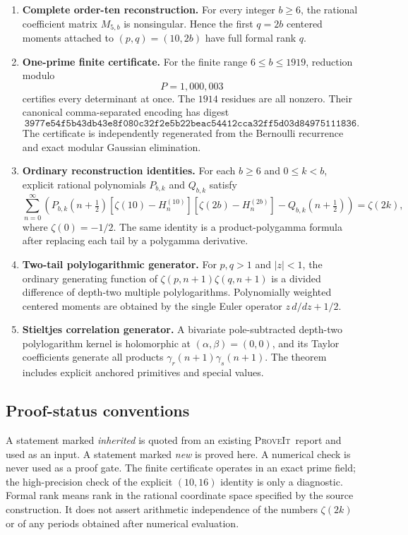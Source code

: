 \documentclass[11pt]{article}
\theoremstyle{definition}
\newcommand{\Repo}{\textsc{ProveIt}}
\begin{document}
\begin{enumerate}[label=\textbf{M\arabic*.}]
\item \textbf{Complete order-ten reconstruction.}
For every integer $b\ge6$, the rational coefficient matrix $M_{5,b}$
is nonsingular.  Hence the first $q=2b$ centered moments attached to
$(p,q)=(10,2b)$ have full formal rank $q$.

\item \textbf{One-prime finite certificate.}
For the finite range $6\le b\le1919$, reduction modulo
\[
 P=1{,}000{,}003
\]
certifies every determinant at once.  The $1914$ residues are all
nonzero.  Their canonical comma-separated encoding has digest
\[
 \texttt{3977e54f5b43db43e8f080c32f2e5b22beac54412cca32ff5d03d84975111836}.
\]
The certificate is independently regenerated from the Bernoulli
recurrence and exact modular Gaussian elimination.

\item \textbf{Ordinary reconstruction identities.}
For each $b\ge6$ and $0\le k<b$, explicit rational polynomials
$P_{b,k}$ and $Q_{b,k}$ satisfy
\[
 \sum_{n=0}^{\infty}
 \left(P_{b,k}(n+\tfrac12)
       [\zeta(10)-H_n^{(10)}][\zeta(2b)-H_n^{(2b)}]
       -Q_{b,k}(n+\tfrac12)\right)=\zeta(2k),
\]
where $\zeta(0)=-1/2$.  The same identity is a product-polygamma
formula after replacing each tail by a polygamma derivative.

\item \textbf{Two-tail polylogarithmic generator.}
For $p,q>1$ and $|z|<1$, the ordinary generating function of
$\zeta(p,n+1)\zeta(q,n+1)$ is a divided difference of depth-two
multiple polylogarithms.  Polynomially weighted centered moments are
obtained by the single Euler operator $z\,d/dz+1/2$.

\item \textbf{Stieltjes correlation generator.}
A bivariate pole-subtracted depth-two polylogarithm kernel is holomorphic
at $(\alpha,\beta)=(0,0)$, and its Taylor coefficients generate all
products $\gamma_r(n+1)\gamma_s(n+1)$.  The theorem includes explicit
anchored primitives and special values.
\end{enumerate}

\subsection{Proof-status conventions}

A statement marked \emph{inherited} is quoted from an existing \Repo\
report and used as an input.  A statement marked \emph{new} is proved
here.  A numerical check is never used as a proof gate.  The finite
certificate operates in an exact prime field; the high-precision check
of the explicit $(10,16)$ identity is only a diagnostic.  Formal rank
means rank in the rational coordinate space specified by the source
construction.  It does not assert arithmetic independence of the
numbers $\zeta(2k)$ or of any periods obtained after numerical
evaluation.
\end{document}
